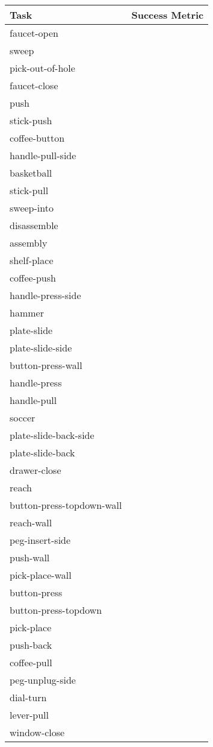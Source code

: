 \begin{table}[h]
    \centering
    \begin{tabular}{lc}
\toprule
\footnotesize Task & Success Metric  \\
\midrule
faucet-open &  \\
sweep & \\
pick-out-of-hole & \\
faucet-close & \\
push & \\
stick-push & \\
coffee-button & \\
handle-pull-side & \\
basketball & \\
stick-pull & \\
sweep-into & \\
disassemble & \\
assembly & \\
shelf-place & \\
coffee-push & \\
handle-press-side & \\
hammer & \\
plate-slide & \\
plate-slide-side & \\
button-press-wall & \\
handle-press & \\
handle-pull & \\
soccer & \\
plate-slide-back-side & \\
plate-slide-back & \\
drawer-close & \\
reach & \\
button-press-topdown-wall & \\
reach-wall & \\
peg-insert-side & \\
push-wall & \\
pick-place-wall & \\
button-press & \\
button-press-topdown & \\
pick-place & \\
push-back & \\
coffee-pull & \\
peg-unplug-side & \\
dial-turn & \\
lever-pull & \\
window-close & \\

\end{tabular}
\end{table}
